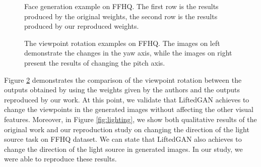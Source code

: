 \begin{figure}[b]
    \centering
    \caption{Face generation example on FFHQ. The first row is the results produced by the original weights, the second row is the results produced by our reproduced weights.}
    \label{fig:original_vs_re_faces}
\end{figure}

\begin{figure}[h!]%
    \centering
    \qquad
    \caption{The viewpoint rotation examples on FFHQ. The images on left demonstrate the changes in the yaw axis, while the images on right present the results of changing the pitch axis.}%
    \label{fig:rotation}%
\end{figure}

Figure \ref{fig:rotation} demonstrates the comparison of the viewpoint rotation between the outputs obtained by using the weights given by the authors and the outputs reproduced by our work. At this point, we validate that LiftedGAN achieves to change the viewpoints in the generated images without affecting the other visual features. Moreover, in Figure \ref{fig:lighting}, we show both qualitative results of the original work and our reproduction study on changing the direction of the light source task on FFHQ dataset. We can state that LiftedGAN also achieves to change the direction of the light source in generated images. In our study, we were able to reproduce these results.

